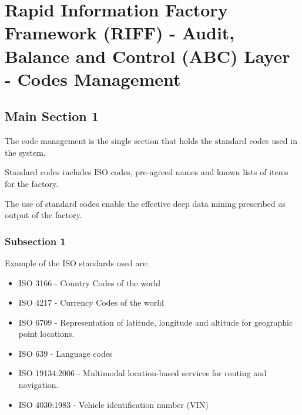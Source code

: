 
\chapter{Rapid Information Factory Framework (RIFF) - Audit, Balance and Control (ABC) Layer - Codes Management} %

\label{Chapter33} %



\section{Main Section 1}

The code management is the single section that holds the standard codes used in the system.

Standard codes includes ISO codes, pre-agreed names and known lists of items for the factory.

The use of standard codes enable the effective deep data mining prescribed as output of the factory.

\subsection{Subsection 1}

Example of the ISO standards used are:

\begin{itemize}
\item{ISO 3166 - Country Codes of the world}
\item{ISO 4217 - Currency Codes of the world}
\item{ISO 6709 - Representation of latitude, longitude and altitude for geographic point locations.}
\item{ISO 639 - Language codes}
\item{ISO 19134:2006 - Multimodal location-based services for routing and navigation.}
\item{ISO 4030:1983 - Vehicle identification number (VIN)}
\end{itemize}

